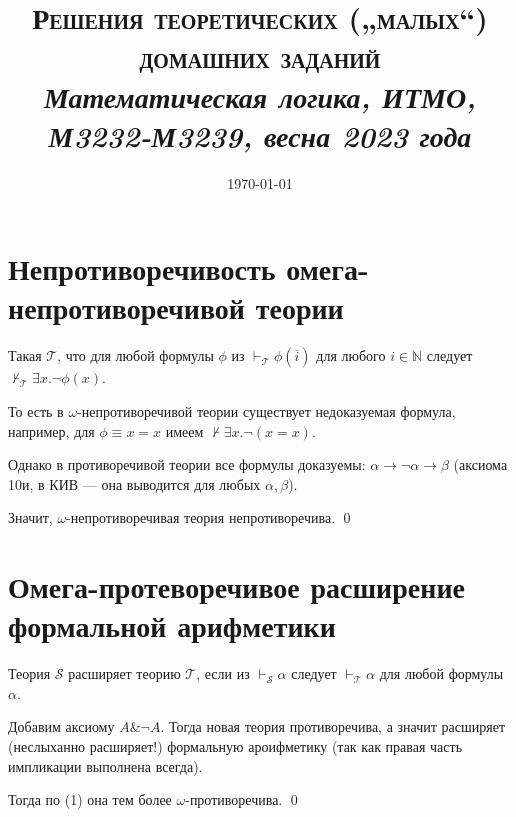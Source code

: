 \documentclass[12pt, a4paper]{article}
\title{{\Large\textsc{Решения \textbf{теоретических („малых“) домашних заданий}}}\\
\it Математическая логика, ИТМО, М3232-М3239, весна 2023 года}
\author{
  \vova
}
\date{\today}
\begin{document}
  \tittoc


\section{Непротиворечивость омега-непротиворечивой теории}

\begin{definition}

    Такая $\mathcal{T}$, что для любой формулы $\phi$ из $\vdash_{\mathcal{T}} \phi\left( \overline{i} \right)$ для любого $i \in \mathbb{N}$ следует $\nvdash_{\mathcal{T}} \exists x. \lnot \phi\left( x \right)$.
\end{definition}

То есть в $\omega$-непротиворечивой теории существует недоказуемая формула, например, для $\phi \equiv x = x$ имеем $\nvdash \exists x. \lnot \left( x = x \right)$.

Однако в противоречивой теории все формулы доказуемы: $\alpha → \lnot \alpha → \beta$ (аксиома 10и, в КИВ — она выводится для любых $\alpha, \beta$).

Значит, $\omega$-непротиворечивая теория непротиворечива. \qed


\section{Омега-протеворечивое расширение формальной арифметики}

\begin{definition}

  Теория $\mathcal{S}$ расширяет теорию $\mathcal{T}$, если из $\vdash_{\mathcal{S}} \alpha$ следует $\vdash_{\mathcal{T}} \alpha$ для любой формулы $\alpha$.
\end{definition}


Добавим аксиому $A \& \lnot A$. Тогда новая теория противоречива,
а значит расширяет (неслыханно расширяет!) формальную ароифметику
(так как правая часть импликации выполнена всегда).

Тогда по (1) она тем более $\omega$-противоречива. \qed
\end{document}
